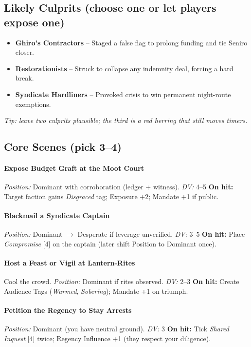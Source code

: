 \documentclass[11pt]{article}
\newcommand{\position}[1]{\textit{Position:} #1}
\newcommand{\dv}[1]{\textit{DV:} #1}
\begin{document}
\subsection*{Likely Culprits (choose one or let players expose one)}
\begin{itemize}
  \item \textbf{Ghiro's Contractors} -- Staged a false flag to prolong funding and tie Seniro closer.
  \item \textbf{Restorationists} -- Struck to collapse any indemnity deal, forcing a hard break.
  \item \textbf{Syndicate Hardliners} -- Provoked crisis to win permanent night-route exemptions.
\end{itemize}
\textit{Tip: leave two culprits plausible; the third is a red herring that still moves timers.}

\subsection*{Core Scenes (pick 3--4)}

\paragraph{Expose Budget Graft at the Moot Court}
\position{Dominant with corroboration (ledger + witness).} \dv{4--5}  
\textbf{On hit:} Target faction gains \textit{Disgraced} tag; Exposure +2; Mandate +1 if public.

\paragraph{Blackmail a Syndicate Captain}
\position{Dominant $\rightarrow$ Desperate if leverage unverified.} \dv{3--5}  
\textbf{On hit:} Place \textit{Compromise} [4] on the captain (later shift Position to Dominant once).

\paragraph{Host a Feast or Vigil at Lantern-Rites}
Cool the crowd.  
\position{Dominant if rites observed.} \dv{2--3}  
\textbf{On hit:} Create Audience Tags (\textit{Warmed}, \textit{Sobering}); Mandate +1 on triumph.

\paragraph{Petition the Regency to Stay Arrests}
\position{Dominant (you have neutral ground).} \dv{3}  
\textbf{On hit:} Tick \textit{Shared Inquest} [4] twice; Regency Influence +1 (they respect your diligence).
\end{document}
